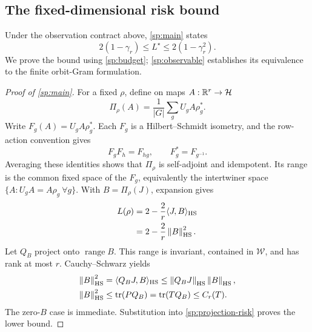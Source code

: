 \subsection{The fixed-dimensional risk bound}
\label{sp:main-proof}
Under the observation contract above, \cref{sp:main} states
\[
 2(1-\gamma_r)\le L^\star\le2(1-\gamma_r^2).
\]
We prove the bound using \cref{sp:budget}; \cref{sp:observable} establishes its equivalence to the finite orbit-Gram formulation.
\begin{proof}[Proof of \cref{sp:main}]
For a fixed $\rho$, define on maps $A:\mathbb{R}^r\to\mathcal H$
\[
 \Pi_\rho(A)=\frac1{|G|}\sum_gU_gA\rho_g^*.
\]
Write $F_g(A)=U_gA\rho_g^*$. Each $F_g$ is a Hilbert--Schmidt isometry, and the row-action convention gives
\[
 F_gF_h=F_{hg},\qquad F_g^*=F_{g^{-1}}.
\]
Averaging these identities shows that $\Pi_\rho$ is self-adjoint and idempotent. Its range is the common fixed space of the $F_g$, equivalently the intertwiner space
$\{A:U_gA=A\rho_g\ \forall g\}$.
With $B=\Pi_\rho(J)$, expansion gives
\begin{equation}
 \begin{aligned}
 L(\rho)
 &=
 2-\frac2r\langle J,B\rangle_{\mathrm{HS}}
 \\
 &=
 2-\frac2r\left\lVert B\right\rVert_{\mathrm{HS}}^2.
 \end{aligned}
 \label{sp:projection-risk}
\end{equation}
Let $Q_B$ project onto $\operatorname{range}B$. This range is invariant, contained in $\mathcal W$, and has rank at most $r$. Cauchy--Schwarz yields
\[
 \begin{aligned}
 \left\lVert B\right\rVert_{\mathrm{HS}}^2
 &=
 \langle Q_BJ,B\rangle_{\mathrm{HS}}
 \le
 \left\lVert Q_BJ\right\rVert_{\mathrm{HS}}\left\lVert B\right\rVert_{\mathrm{HS}},
 \\
 \left\lVert B\right\rVert_{\mathrm{HS}}^2
 &\le
 \operatorname{tr}(PQ_B)
 =
 \operatorname{tr}(TQ_B)
 \le C_r(T).
 \end{aligned}
\]
The zero-$B$ case is immediate. Substitution into \cref{sp:projection-risk} proves the lower bound.


\end{proof}
